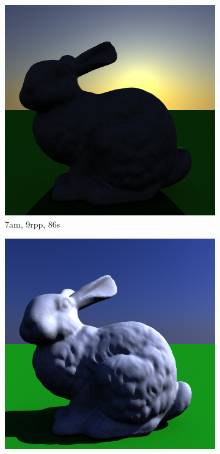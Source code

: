  \begin{figure}[h]
	\centering
	\begin{subfigure}[b]{0.4\textwidth}
		\includegraphics[width=\textwidth]{week4/bunny_ambient_9rpp_86s_7.png}
		\caption{7am, 9rpp, 86s}
	\end{subfigure}
	\begin{subfigure}[b]{0.4\textwidth}
		\includegraphics[width=\textwidth]{week4/bunny_ambient_9rpp_83s_12.png}

\end{subfigure}
\end{figure}
